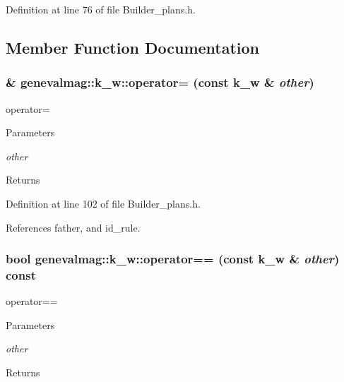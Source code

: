 Definition at line 76 of file Builder\_\-plans.h.



\subsection{Member Function Documentation}
\hypertarget{structgenevalmag_1_1k__w_a60b600d54504f37f1abb332481ae3886}{
\subsubsection[{operator=}]{\& genevalmag::k\_\-w::operator= (const {\bf k\_\-w} \& {\em other})}}
\label{structgenevalmag_1_1k__w_a60b600d54504f37f1abb332481ae3886}
operator= 
\begin{DoxyParams}{Parameters}
\item[{\em other}]\end{DoxyParams}
\begin{DoxyReturn}{Returns}

\end{DoxyReturn}


Definition at line 102 of file Builder\_\-plans.h.



References father, and id\_\-rule.

\hypertarget{structgenevalmag_1_1k__w_abfdaef873a635401975794595679a251}{
\subsubsection[{operator==}]{\setlength{\rightskip}{0pt plus 5cm}bool genevalmag::k\_\-w::operator== (const {\bf k\_\-w} \& {\em other}) const}}
\label{structgenevalmag_1_1k__w_abfdaef873a635401975794595679a251}
operator== 
\begin{DoxyParams}{Parameters}
\item[{\em other}]\end{DoxyParams}
\begin{DoxyReturn}{Returns}

\end{DoxyReturn}


